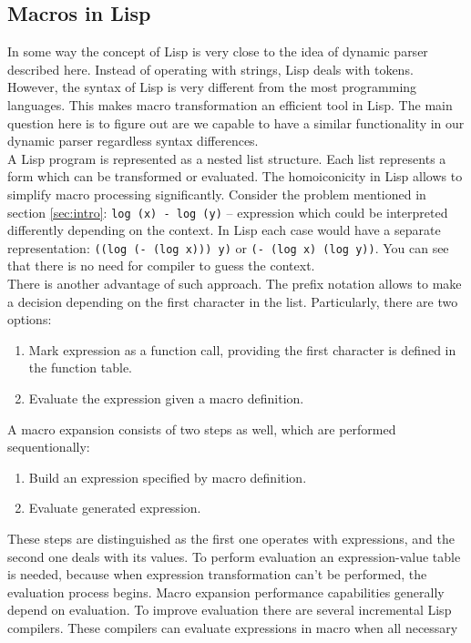 \subsection{Macros in Lisp}
In some way the concept of Lisp is very close to the idea of dynamic parser
described here. Instead of operating with strings, Lisp deals with tokens.
However, the syntax of Lisp is very different from the most programming
languages. This makes macro transformation an efficient tool in Lisp. The main
question here is to figure out are we capable to have a similar functionality
in our dynamic parser regardless syntax differences. \\
A Lisp program is represented as a nested list structure. Each list
represents a form which can be transformed or evaluated. The homoiconicity in
Lisp allows to simplify macro processing significantly. Consider the problem
mentioned in section \ref{sec:intro}: \verb|log (x) - log (y)| -- expression
which could be interpreted differently depending on the context. In Lisp each
case would have a separate representation: \verb|((log (- (log x))) y)| or
\verb|(- (log x) (log y))|. You can see that there is no need for compiler to
guess the context. \\
There is another advantage of such approach. The prefix notation allows to make
a decision depending on the first character in the list. Particularly, there 
are two options:
\begin{enumerate}
    \item Mark expression as a function call, providing  the first character is 
          defined in the function table.
    \item Evaluate the expression given a macro definition. 
\end{enumerate}
A macro expansion consists of two steps as well, which are performed
sequentionally:
\begin{enumerate}
    \item Build an expression specified by macro definition.
    \item Evaluate generated expression.
\end{enumerate}
These steps are distinguished as the first one operates with expressions, and
the second one deals with its values. To perform evaluation an expression-value
table is needed, because when expression transformation can't be performed, the
evaluation process begins. Macro expansion performance capabilities generally
depend on evaluation. To improve evaluation there are several incremental Lisp
compilers. These compilers can evaluate expressions in macro when all necessary
